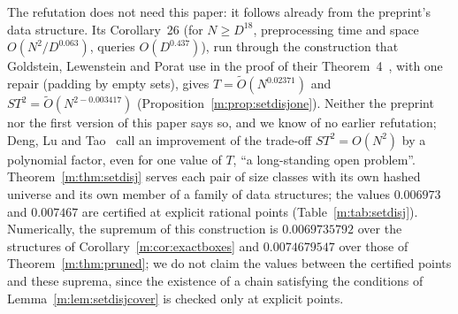 \documentclass[11pt]{article}
\theoremstyle{definition}
\theoremstyle{remark}
\newcommand{\SetDisjEta}{0.006973}%
\newcommand{\SetDisjEtaPruned}{0.007467}%
\newcommand{\SetDisjEtaPreprint}{0.003417}%
\newcommand{\SetDisjTauPreprint}{0.02371}%
\begin{document}
The refutation does not need this paper: it follows already from the preprint's data structure. Its Corollary~26 (for $N\ge D^{18}$, preprocessing time and space $O(N^2/D^{0.063})$, queries $O(D^{0.437})$), run through the construction that Goldstein, Lewenstein and Porat use in the proof of their Theorem~4~\cite{GLP19}, with one repair (padding by empty sets), gives $T=\tilde O(N^{\SetDisjTauPreprint})$ and $ST^2=\tilde O(N^{2-\SetDisjEtaPreprint})$ (Proposition~\ref{m:prop:setdisjone}). Neither the preprint nor the first version of this paper says so, and we know of no earlier refutation; Deng, Lu and Tao~\cite{DLT23} call an improvement of the trade-off $ST^2=O(N^2)$ by a polynomial factor, even for one value of $T$, ``a long-standing open problem''. Theorem~\ref{m:thm:setdisj} serves each pair of size classes with its own hashed universe and its own member of a family of data structures; the values $\SetDisjEta$ and $\SetDisjEtaPruned$ are certified at explicit rational points (Table~\ref{m:tab:setdisj}).
Numerically, the supremum of this construction is $0.0069735792$ over the structures of Corollary~\ref{m:cor:exactboxes} and $0.0074679547$ over those of Theorem~\ref{m:thm:pruned}; we do not claim the values between the certified points and these suprema, since the existence of a chain satisfying the conditions of Lemma~\ref{m:lem:setdisjcover} is checked only at explicit points.
\end{document}
